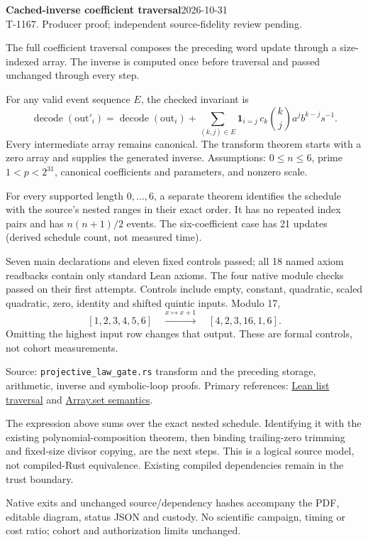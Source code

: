 \documentclass[10pt]{article}
\begin{document}
\textbf{Cached-inverse coefficient traversal}\hfill2026-10-31\\T-1167. Producer proof; independent source-fidelity review pending.

The full coefficient traversal composes the preceding word update through a size-indexed array. The inverse is computed once before traversal and passed unchanged through every step.

For any valid event sequence $E$, the checked invariant is
\[
 \operatorname{decode}(\mathrm{out}'_i)=\operatorname{decode}(\mathrm{out}_i)
 +\sum_{(k,j)\in E}\mathbf{1}_{i=j}\,c_k\binom{k}{j}a^jb^{k-j}s^{-1}.
\]
Every intermediate array remains canonical. The transform theorem starts with a zero array and supplies the generated inverse. Assumptions: $0\le n\le6$, prime $1<p<2^{31}$, canonical coefficients and parameters, and nonzero scale.
\begin{center}\end{center}
For every supported length $0,\ldots,6$, a separate theorem identifies the schedule with the source's nested ranges in their exact order. It has no repeated index pairs and has $n(n+1)/2$ events. The six-coefficient case has 21 updates (derived schedule count, not measured time).

Seven main declarations and eleven fixed controls passed; all 18 named axiom readbacks contain only standard Lean axioms. The four native module checks passed on their first attempts. Controls include empty, constant, quadratic, scaled quadratic, zero, identity and shifted quintic inputs. Modulo 17,
\[
 [1,2,3,4,5,6]\quad\xrightarrow{x\mapsto x+1}\quad[4,2,3,16,1,6].
\]
Omitting the highest input row changes that output. These are formal controls, not cohort measurements.

Source: \texttt{projective\_law\_gate.rs} transform and the preceding storage, arithmetic, inverse and symbolic-loop proofs. Primary references: \href{https://lean-lang.org/doc/api/Init/Data/List/Control.html}{Lean list traversal} and \href{https://lean-lang.org/doc/api/Init/Data/Array/Set.html}{Array.set semantics}.

The expression above sums over the exact nested schedule. Identifying it with the existing polynomial-composition theorem, then binding trailing-zero trimming and fixed-size divisor copying, are the next steps. This is a logical source model, not compiled-Rust equivalence. Existing compiled dependencies remain in the trust boundary.

Native exits and unchanged source/dependency hashes accompany the PDF, editable diagram, status JSON and custody. No scientific campaign, timing or cost ratio; cohort and authorization limits unchanged.
\end{document}
